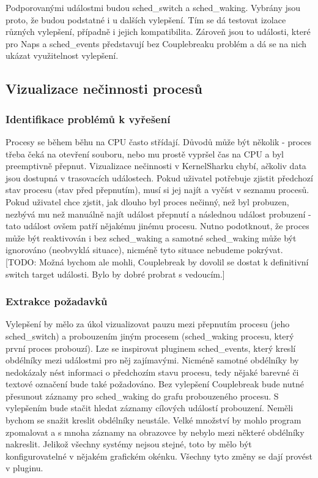 Podporovanými událostmi budou sched\_switch a sched\_waking. Vybrány jsou proto, že budou podstatné i u dalších vylepšení. Tím se dá testovat izolace různých vylepšení, případně i jejich kompatibilita. Zároveň jsou to události, které pro Naps a sched\_events představují bez Couplebreaku problém a dá se na nich ukázat využitelnost vylepšení.

\subsection{Vizualizace nečinnosti procesů}

\subsubsection*{Identifikace problémů k vyřešení}
Procesy se během běhu na CPU často střídají. Důvodů může být několik - proces třeba čeká na otevření souboru, nebo mu prostě vypršel čas na CPU a byl preemptivně přepnut. Vizualizace nečinnosti v KernelSharku chybí, ačkoliv data jsou dostupná v trasovacích událostech. Pokud uživatel potřebuje zjistit předchozí stav procesu (stav před přepnutím), musí si jej najít a vyčíst v seznamu procesů. Pokud uživatel chce zjstit, jak dlouho byl proces nečinný, než byl probuzen, nezbývá mu než manuálně najít událost přepnutí a následnou událost probuzení - tato událost ovšem patří nějakému jinému procesu. Nutno podotknout, že proces může být reaktivován i bez sched\_waking a samotné sched\_waking může být ignorováno (neobvyklá situace), nicméně tyto situace nebudeme pokrývat. [TODO: Možná bychom ale mohli, Couplebreak by dovolil se dostat k definitivní switch target události. Bylo by dobré probrat s vedoucím.]

\subsubsection*{Extrakce požadavků}
Vylepšení by mělo za úkol vizualizovat pauzu mezi přepnutím procesu (jeho sched\_switch) a probouzením jiným procesem (sched\_waking procesu, který první proces probouzí). Lze se inspirovat pluginem sched\_events, který kreslí obdélníky mezi událostmi pro něj zajímavými. Nicméně samotné obdélníky by nedokázaly nést informaci o předchozím stavu procesu, tedy nějaké barevné či textové označení bude také požadováno. Bez vylepšení Couplebreak bude nutné přesunout záznamy pro sched\_waking do grafu probouzeného procesu. S vylepšením bude stačit hledat záznamy cílových událostí probouzení. Neměli bychom se snažit kreslit obdélníky neustále. Velké množství by mohlo program zpomalovat a s mnoha záznamy na obrazovce by nebylo mezi některé obdélníky nakreslit. Jelikož všechny systémy nejsou stejné, toto by mělo být konfigurovatelné v nějakém grafickém okénku. Všechny tyto změny se dají provést v pluginu.

